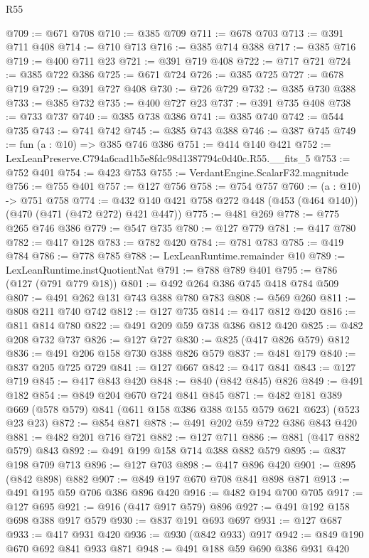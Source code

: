 \begin{lexlean}{R55}
\begin{coremodule}
@709 := @671 @708
@710 := @385 @709
@711 := @678 @703
@713 := @391 @711 @408
@714 := @710 @713
@716 := @385 @714 @388
@717 := @385 @716
@719 := @400 @711 @23
@721 := @391 @719 @408
@722 := @717 @721
@724 := @385 @722 @386
@725 := @671 @724
@726 := @385 @725
@727 := @678 @719
@729 := @391 @727 @408
@730 := @726 @729
@732 := @385 @730 @388
@733 := @385 @732
@735 := @400 @727 @23
@737 := @391 @735 @408
@738 := @733 @737
@740 := @385 @738 @386
@741 := @385 @740
@742 := @544 @735
@743 := @741 @742
@745 := @385 @743 @388
@746 := @387 @745
@749 := fun (a : @10) => @385 @746 @386
@751 := @414 @140 @421
@752 := LexLeanPreserve.C794a6cad1b5e8fdc98d1387794c0d40c.R55.__fits_5
@753 := @752 @401
@754 := @423 @753
@755 := VerdantEngine.ScalarF32.magnitude
@756 := @755 @401
@757 := @127 @756
@758 := @754 @757
@760 := (a : @10) -> @751 @758
@774 := @432 @140 @421 @758 @272 @448 (@453 (@464 @140)) (@470 (@471 (@472 @272) @421 @447))
@775 := @481 @269
@778 := @775 @265 @746 @386
@779 := @547 @735
@780 := @127 @779
@781 := @417 @780
@782 := @417 @128
@783 := @782 @420
@784 := @781 @783
@785 := @419 @784
@786 := @778 @785
@788 := LexLeanRuntime.remainder @10
@789 := LexLeanRuntime.instQuotientNat
@791 := @788 @789 @401
@795 := @786 (@127 (@791 @779 @18))
@801 := @492 @264 @386 @745 @418 @784 @509
@807 := @491 @262 @131 @743 @388 @780 @783
@808 := @569 @260
@811 := @808 @211 @740 @742
@812 := @127 @735
@814 := @417 @812 @420
@816 := @811 @814 @780
@822 := @491 @209 @59 @738 @386 @812 @420
@825 := @482 @208 @732 @737
@826 := @127 @727
@830 := @825 (@417 @826 @579) @812
@836 := @491 @206 @158 @730 @388 @826 @579
@837 := @481 @179
@840 := @837 @205 @725 @729
@841 := @127 @667
@842 := @417 @841
@843 := @127 @719
@845 := @417 @843 @420
@848 := @840 (@842 @845) @826
@849 := @491 @182
@854 := @849 @204 @670 @724 @841 @845
@871 := @482
    @181
    @389
    @669
    (@578 @579)
    @841
    (@611 @158 @386 @388 @155 @579 @621 @623)
    (@523 @23 @23)
@872 := @854 @871
@878 := @491 @202 @59 @722 @386 @843 @420
@881 := @482 @201 @716 @721
@882 := @127 @711
@886 := @881 (@417 @882 @579) @843
@892 := @491 @199 @158 @714 @388 @882 @579
@895 := @837 @198 @709 @713
@896 := @127 @703
@898 := @417 @896 @420
@901 := @895 (@842 @898) @882
@907 := @849 @197 @670 @708 @841 @898 @871
@913 := @491 @195 @59 @706 @386 @896 @420
@916 := @482 @194 @700 @705
@917 := @127 @695
@921 := @916 (@417 @917 @579) @896
@927 := @491 @192 @158 @698 @388 @917 @579
@930 := @837 @191 @693 @697
@931 := @127 @687
@933 := @417 @931 @420
@936 := @930 (@842 @933) @917
@942 := @849 @190 @670 @692 @841 @933 @871
@948 := @491 @188 @59 @690 @386 @931 @420

\end{coremodule}
\end{lexlean}
